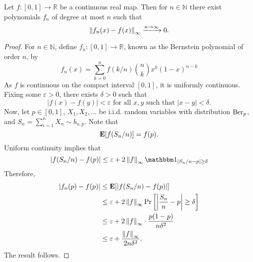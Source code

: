\begin{corollary}
    Let $f:[0,1]\to\mathbb{R}$ be a continuous real map. Then for $n\in\mathbb{N}$ there exist polynomials $f_n$ of degree at most $n$ such that
    $$\left\lVert f_n(x)-f(x)\right\rVert_\infty \xrightarrow{n\to\infty} 0.$$
\end{corollary}
\begin{proof}
    For $n\in\mathbb{N}$, define $f_n:[0,1]\to\mathbb{R}$, known as the Bernstein polynomial of order $n$, by
    $$f_n(x) = \sum_{k=0}^n f(k/n)\binom{n}{k}x^k(1-x)^{n-k}$$
    As $f$ is continuous on the compact interval $[0,1]$, it is uniformly continuous. Fixing some $\varepsilon>0$, there exists $\delta>0$ such that
    $$|f(x)-f(y)|<\varepsilon\text{ for all $x,y$ such that } |x-y|<\delta.$$
    Now, let $p\in[0,1]$, $X_1,X_2,\ldots$ be i.i.d. random variables with distribution $\operatorname{Ber}_p$, and $S_n=\sum_{i=1}^n X_n\sim b_{n,p}$. Note that
    $$\textbf{E}[f(S_n/n)]=f(p).$$
    Uniform continuity implies that
    $$|f(S_n/n) - f(p)| \leq \varepsilon + 2\norm{f}_\infty\indic_{|S_n/n - p| \geq \delta}$$
    Therefore,
    \begin{align*}
        |f_n(p) - f(p)| &\leq \textbf{E}[|f(S_n/n) - f(p)|] \\
        &\leq \varepsilon + 2\left\lVert f\right\rVert_\infty\Pr\left[\left|\frac{S_n}{n} - p\right|\geq\delta\right] \\
        &\leq \varepsilon + 2\left\lVert f\right\rVert_\infty\cdot \frac{p(1-p)}{n\delta^2} \\
        &\leq \varepsilon + \frac{\left\lVert f\right\rVert_\infty}{2n\delta^2}.
    \end{align*}
    The result follows.
\end{proof}


